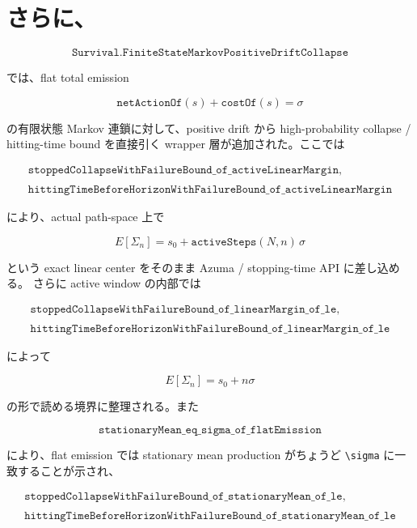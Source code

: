\documentclass[12pt,a4paper]{article}
\begin{document}
\section{さらに、}\label{ux3055ux3089ux306b-6}

\[
\texttt{Survival.FiniteStateMarkovPositiveDriftCollapse}
\]

では、flat total emission

\[
\texttt{netActionOf}(s) + \texttt{costOf}(s) = \sigma
\]

の有限状態 Markov 連鎖に対して、positive drift から high-probability collapse / hitting-time bound を直接引く wrapper 層が追加された。ここでは

\[
\begin{aligned}
\texttt{stoppedCollapseWithFailureBound\_of\_activeLinearMargin}, \\
\qquad \\
\texttt{hittingTimeBeforeHorizonWithFailureBound\_of\_activeLinearMargin}
\end{aligned}
\]

により、actual path-space 上で

\[
E[\Sigma_{n}] = s_0 + \texttt{activeSteps}(N,n)\,\sigma
\]

という exact linear center をそのまま Azuma / stopping-time API に差し込める。 さらに active window の内部では

\[
\begin{aligned}
\texttt{stoppedCollapseWithFailureBound\_of\_linearMargin\_of\_le}, \\
\qquad \\
\texttt{hittingTimeBeforeHorizonWithFailureBound\_of\_linearMargin\_of\_le}
\end{aligned}
\]

によって

\[
E[\Sigma_{n}] = s_0 + n\sigma
\]

の形で読める境界に整理される。また

\[
\texttt{stationaryMean\_eq\_sigma\_of\_flatEmission}
\]

により、flat emission では stationary mean production がちょうど \texttt{\textbackslash{}sigma} に一致することが示され、

\[
\begin{aligned}
\texttt{stoppedCollapseWithFailureBound\_of\_stationaryMean\_of\_le}, \\
\qquad \\
\texttt{hittingTimeBeforeHorizonWithFailureBound\_of\_stationaryMean\_of\_le}
\end{aligned}
\]
\end{document}
